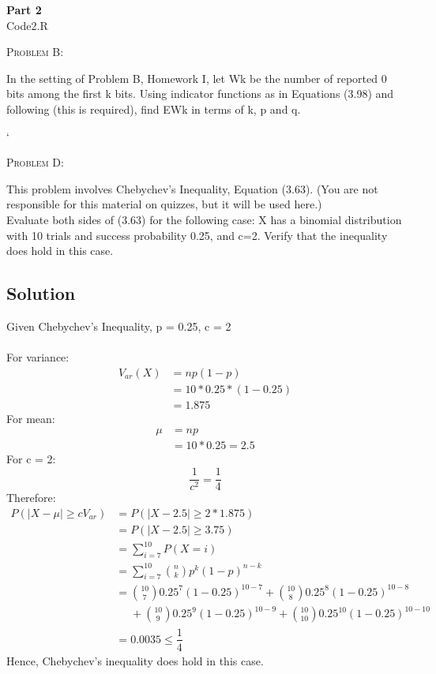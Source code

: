 \documentclass[12pt]{article}
\newenvironment{statement}[1]
{\begin{mdframed}[linewidth=0.6pt]
        \textsc{ #1:}

}
    {\end{mdframed}}
\begin{document}
\textbf{Part 2 }\\
Code2.R
\newpage
\begin{statement}{Problem B}
In the setting of Problem B, Homework I, let Wk be the number of reported 0 bits among the first k bits. Using indicator functions as in Equations (3.98) and following (this is required), find EWk in terms of k, p and q.
\end{statement}





`

\newpage
\begin{statement}{Problem D}
    This problem involves Chebychev's Inequality, Equation (3.63). (You are not responsible for this material on quizzes, but it will be used here.)\\

    Evaluate both sides of (3.63) for the following case: X has a binomial distribution with 10 trials and success probability 0.25, and c=2. Verify that the inequality does hold in this case.
\end{statement}

\subsection{Solution}
Given Chebychev's Inequality, p = 0.25, c = 2\\\\
For variance:
\begin{equation}
    \begin{aligned}
        V_{ar}(X)&=np(1-p)\\
        &=10*0.25*(1-0.25)\\
        &=1.875
    \end{aligned}
\end{equation}
For mean:
\begin{equation}
    \begin{aligned}
        \mu&=np\\
        &=10*0.25=2.5
    \end{aligned}
\end{equation}
For c = 2:
\begin{equation}
    \dfrac{1}{c^2}=\dfrac{1}{4}
\end{equation}
Therefore:
\begin{equation}
    \begin{aligned}
        P(|X-\mu|\geq cV_{ar})&=P(|X-2.5|\geq 2*1.875)\\
        &=P(|X-2.5|\geq 3.75)\\
        &=\sum\limits_{i=7}^{10}P(X=i)\\
        &=\sum\limits_{i=7}^{10}\binom{n}{k}p^k(1-p)^{n-k}\\
        &=\binom{10}{7}0.25^7(1-0.25)^{10-7}+\binom{10}{8}0.25^8(1-0.25)^{10-8}\\
        &\ \ \ \ \ \ +\binom{10}{9}0.25^9(1-0.25)^{10-9}+\binom{10}{10}0.25^{10}(1-0.25)^{10-10}\\
        &=0.0035\leq\dfrac{1}{4}
    \end{aligned}
\end{equation}
Hence, Chebychev's inequality does hold in this case.
\end{document}
